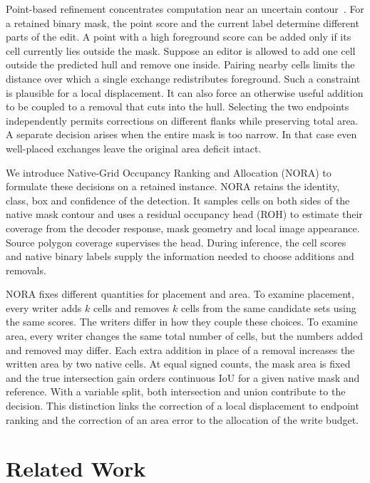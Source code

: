 \documentclass[journal]{IEEEtran}
\begin{document}
Point-based refinement concentrates computation near an uncertain contour~\cite{pointrend}. For a retained binary mask, the point score and the current label determine different parts of the edit. A point with a high foreground score can be added only if its cell currently lies outside the mask. Suppose an editor is allowed to add one cell outside the predicted hull and remove one inside. Pairing nearby cells limits the distance over which a single exchange redistributes foreground. Such a constraint is plausible for a local displacement. It can also force an otherwise useful addition to be coupled to a removal that cuts into the hull. Selecting the two endpoints independently permits corrections on different flanks while preserving total area. A separate decision arises when the entire mask is too narrow. In that case even well-placed exchanges leave the original area deficit intact.

We introduce Native-Grid Occupancy Ranking and Allocation (NORA) to formulate these decisions on a retained instance. NORA retains the identity, class, box and confidence of the detection. It samples cells on both sides of the native mask contour and uses a residual occupancy head (ROH) to estimate their coverage from the decoder response, mask geometry and local image appearance. Source polygon coverage supervises the head. During inference, the cell scores and native binary labels supply the information needed to choose additions and removals.

NORA fixes different quantities for placement and area. To examine placement, every writer adds \(k\) cells and removes \(k\) cells from the same candidate sets using the same scores. The writers differ in how they couple these choices. To examine area, every writer changes the same total number of cells, but the numbers added and removed may differ. Each extra addition in place of a removal increases the written area by two native cells. At equal signed counts, the mask area is fixed and the true intersection gain orders continuous IoU for a given native mask and reference. With a variable split, both intersection and union contribute to the decision. This distinction links the correction of a local displacement to endpoint ranking and the correction of an area error to the allocation of the write budget.

\section{Related Work}
\label{sec:related-work}
\end{document}
